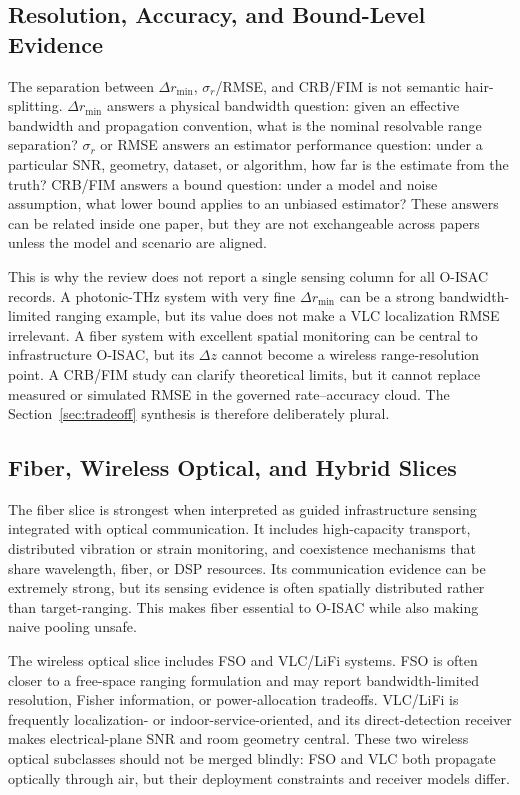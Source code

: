 \documentclass[letterpaper,journal]{IEEEtran}
\begin{document}
\subsection{Resolution, Accuracy, and Bound-Level Evidence}

The separation between \(\Delta r_{\min}\), \(\sigma_r\)/RMSE, and CRB/FIM is not semantic hair-splitting. \(\Delta r_{\min}\) answers a physical bandwidth question: given an effective bandwidth and propagation convention, what is the nominal resolvable range separation? \(\sigma_r\) or RMSE answers an estimator performance question: under a particular SNR, geometry, dataset, or algorithm, how far is the estimate from the truth? CRB/FIM answers a bound question: under a model and noise assumption, what lower bound applies to an unbiased estimator? These answers can be related inside one paper, but they are not exchangeable across papers unless the model and scenario are aligned.

This is why the review does not report a single sensing column for all O-ISAC records. A photonic-THz system with very fine \(\Delta r_{\min}\) can be a strong bandwidth-limited ranging example, but its value does not make a VLC localization RMSE irrelevant. A fiber system with excellent spatial monitoring can be central to infrastructure O-ISAC, but its \(\Delta z\) cannot become a wireless range-resolution point. A CRB/FIM study can clarify theoretical limits, but it cannot replace measured or simulated RMSE in the governed rate--accuracy cloud. The Section~\ref{sec:tradeoff} synthesis is therefore deliberately plural.

\subsection{Fiber, Wireless Optical, and Hybrid Slices}

The fiber slice is strongest when interpreted as guided infrastructure sensing integrated with optical communication. It includes high-capacity transport, distributed vibration or strain monitoring, and coexistence mechanisms that share wavelength, fiber, or DSP resources. Its communication evidence can be extremely strong, but its sensing evidence is often spatially distributed rather than target-ranging. This makes fiber essential to O-ISAC while also making naive pooling unsafe.

The wireless optical slice includes FSO and VLC/LiFi systems. FSO is often closer to a free-space ranging formulation and may report bandwidth-limited resolution, Fisher information, or power-allocation tradeoffs. VLC/LiFi is frequently localization- or indoor-service-oriented, and its direct-detection receiver makes electrical-plane SNR and room geometry central. These two wireless optical subclasses should not be merged blindly: FSO and VLC both propagate optically through air, but their deployment constraints and receiver models differ.
\end{document}
